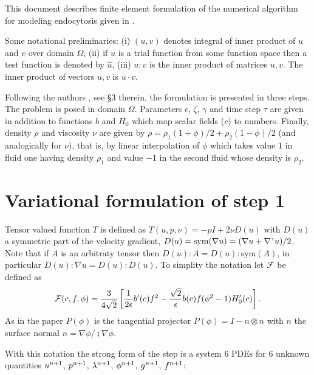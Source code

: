 This document describes finite element formulation of the numerical algorithm
for modeling endocytosis given in \cite{lowengrub2016numerical}.

Some notational preliminaries: (i) $(u, v)$ denotes integral of inner product
of $u$ and $v$ over domain $\Omega$, (ii) if $u$ is a trial function from some
function space then a test function is denoted by $\hat{u}$, (iii) $u:v$ is
the inner product of matrices $u, v$. The inner product of vectors $u, v$ is
$u\cdot v$.

Following the authors \cite{lowengrub2016numerical}, see \S 3 therein,
the formulation is presented in three steps. The problem is posed in
domain $\Omega$. Parameters $\epsilon$, $\zeta$, $\gamma$ and time step
$\tau$ are given in addition to functions $b$ and $H_0$ which map scalar
fields ($c$) to numbers. Finally, density $\rho$ and viscosity $\nu$ are
given by $\rho=\rho_1(1+\phi)/2 + \rho_2(1-\phi)/2$ (and analogically
for $\nu$), that is, by linear interpolation of $\phi$ which takes value
$1$ in fluid one having density $\rho_1$ and value $-1$ in the second
fluid whose density is $\rho_2$.

\section*{Variational formulation of step 1}
Tensor valued function $T$ is defined as $T(u, p, \nu)=-pI + 2\nu D(u)$ with
$D(u)$ a symmetric part of the velocity gradient,
$D(u)=\text{sym}(\nabla u) = (\nabla u + \transp{\nabla} u)/2$.
Note that if $A$ is an arbitraty tensor then $D(u):A=D(u):\text{sym}(A)$,
in particular $D(u):\nabla u=D(u):D(u)$. To simplity the notation let
$\mathcal{F}$ be defined as
%
\[
 \mathcal{F}(c, f, \phi) = \frac{3}{4\sqrt{2}}\left[
 \frac{1}{2\epsilon}b^{\prime}(c)f^2 -
 \frac{\sqrt{2}}{\epsilon}b(c)f(\phi^2-1)H_0^{\prime}(c)
 \right].
\]
%
As in the paper $P(\phi)$ is the tangential projector $P(\phi)=I-n\otimes n$
with $n$ the surface normal $n=\nabla \phi/\semi{\nabla{\phi}}$.

With this notation the strong form of the step is a system 6 PDEs for
6 unknown quantities $u^{n+1}$, $p^{n+1}$, $\lambda^{n+1}$,
$\phi^{n+1}$, $g^{n+1}$, $f^{n+1}$:
%

